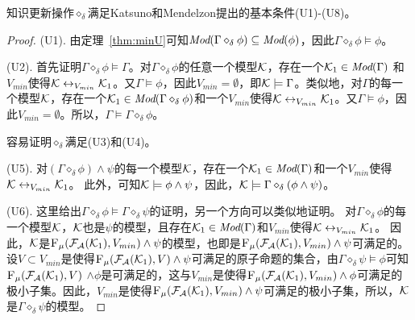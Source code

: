 \begin{theorem}\label{thm:U1toU8}
	知识更新操作$\diamond_{\delta}$满足Katsuno和Mendelzon提出的基本条件(U1)-(U8)。
\end{theorem}
\begin{proof}
	(U1). 由定理~\ref{thm:minU}可知$\textit{Mod}(\Gamma \diamond_{\delta} \phi) \subseteq \textit{Mod}(\phi)$，因此$\Gamma \diamond_{\delta} \phi \models \phi$。
	
	 
	
	(U2). 首先证明$\Gamma \diamond_{\delta} \phi \models \Gamma$。对$\Gamma \diamond_{\delta} \phi$的任意一个模型${\cal K}$，存在一个${\cal K}_1 \in \textit{Mod}(\Gamma)$ 和 $V_{min}$使得${\cal K} \leftrightarrow_{V_{min}} {\cal K}_1$。又$\Gamma \models \phi$，因此$V_{min} = \emptyset$，即${\cal K} \models  \Gamma$。类似地，对$\Gamma$的每一个模型${\cal K}$，存在一个${\cal K}_1\in \textit{Mod}(\Gamma \diamond_{\delta} \phi)$和一个$V_{min}$使得${\cal K} \leftrightarrow_{V_{min}} {\cal K}_1$。又$\Gamma \models \phi$，因此$V_{min} = \emptyset$。所以，$\Gamma \models \Gamma \diamond_{\delta} \phi$。
	
	 
	
	容易证明$\diamond_{\delta}$满足(U3)和(U4)。
	
	(U5). 对$(\Gamma \diamond_{\delta} \phi) \wedge \psi$的每一个模型${\cal K}$，存在一个${\cal K}_1 \in \textit{Mod}(\Gamma)$和一个$V_{min}$使得${\cal K} \leftrightarrow_{V_{min}} {\cal K}_1$。
	此外，可知${\cal K} \models \phi \wedge \psi$，因此，${\cal K} \models \Gamma \diamond_{\delta} (\phi \wedge \psi)$。
	 
	(U6). 这里给出$\Gamma \diamond_{\delta} \phi \models \Gamma \diamond_{\delta} \psi$的证明，另一个方向可以类似地证明。
	对$\Gamma \diamond_{\delta} \phi$的每一个模型${\cal K}$，${\cal K}$也是$\psi$的模型，且存在${\cal K}_1 \in \textit{Mod}(\Gamma)$和$V_{min}$使得${\cal K} \leftrightarrow_{V_{min}} {\cal K}_1$。
	因此，${\cal K}$是${\textsc{F}_{\textsc{$\mu$}}}({\cal F}_{{\cal A}}({\cal K}_1), V_{min}) \wedge \psi$的模型，也即是${\textsc{F}_{\textsc{$\mu$}}}({\cal F}_{{\cal A}}({\cal K}_1), V_{min}) \wedge \psi$可满足的。
	设$V\subset V_{min}$是使得${\textsc{F}_{\textsc{$\mu$}}}({\cal F}_{{\cal A}}({\cal K}_1), V) \wedge \psi$可满足的原子命题的集合，由$\Gamma \diamond_{\delta} \psi \models \phi$可知${\textsc{F}_{\textsc{$\mu$}}}({\cal F}_{{\cal A}}({\cal K}_1), V)$ $\wedge \phi$是可满足的，这与$V_{min}$是使得${\textsc{F}_{\textsc{$\mu$}}}({\cal F}_{{\cal A}}({\cal K}_1), V_{min}) \wedge \phi$可满足的极小子集。因此，$V_{min}$是使得${\textsc{F}_{\textsc{$\mu$}}}({\cal F}_{{\cal A}}({\cal K}_1), V_{min}) \wedge \psi$可满足的极小子集，所以，${\cal K}$是$\Gamma \diamond_{\delta} \psi$的模型。
	

\end{proof}
